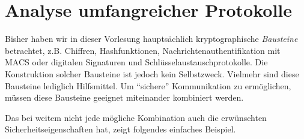 \chapter{Analyse umfangreicher Protokolle}

Bisher haben wir in dieser Vorlesung hauptsächlich kryptographische \emph{Bausteine} betrachtet, z.B. Chiffren, Hashfunktionen, Nachrichtenauthentifikation mit MACS oder digitalen Signaturen und Schlüsselaustauschprotokolle.
Die Konstruktion solcher Bausteine ist jedoch kein Selbstzweck.
Vielmehr sind diese Bausteine lediglich Hilfsmittel. Um "`sichere"' Kommunikation zu ermöglichen, müssen diese Bausteine geeignet miteinander kombiniert werden.

Das bei weitem nicht jede mögliche Kombination auch die erwünschten Sicherheitseigenschaften hat, zeigt folgendes einfaches Beispiel.\\

